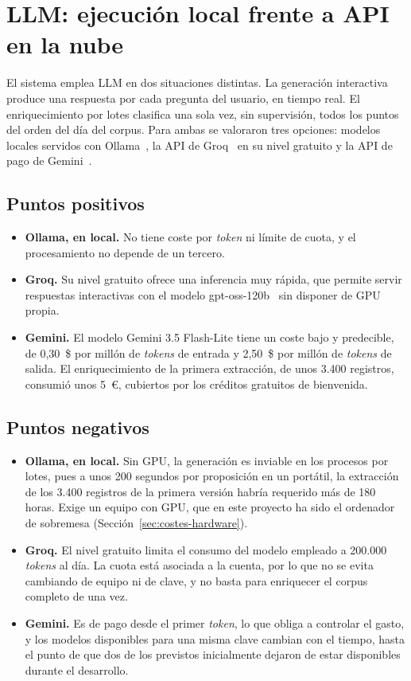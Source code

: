 \documentclass[11pt, a4paper]{report}
\begin{document}
	\section{LLM: ejecución local frente a API en la nube}

	El sistema emplea LLM en dos situaciones distintas. La
	generación interactiva produce una respuesta por cada pregunta del usuario, en
	tiempo real. El enriquecimiento por lotes clasifica una sola vez, sin
	supervisión, todos los puntos del orden del día del corpus. Para ambas se
	valoraron tres opciones: modelos locales servidos con
	Ollama~\cite{ollama}, la API de
	Groq~\cite{groq} en su nivel gratuito y la API de pago de
	Gemini~\cite{gemini-api}.

	\subsection{Puntos positivos}

	\begin{itemize}
		\item \textbf{Ollama, en local.} No tiene coste por \textit{token} ni límite de
		cuota, y el procesamiento no depende de un tercero.
		\item \textbf{Groq.} Su nivel gratuito ofrece una inferencia muy rápida,
		que permite servir respuestas interactivas con el modelo gpt-oss-120b~\cite{gpt-oss} sin
		disponer de GPU propia.
		\item \textbf{Gemini.} El modelo Gemini 3.5 Flash-Lite tiene un coste bajo
		y predecible, de 0,30~\$ por millón de \textit{tokens} de entrada y 2,50~\$ por
		millón de \textit{tokens} de salida. El enriquecimiento de la primera extracción,
		de unos 3.400 registros, consumió unos 5~€, cubiertos por los créditos
		gratuitos de bienvenida.
	\end{itemize}

	\subsection{Puntos negativos}

	\begin{itemize}
		\item \textbf{Ollama, en local.} Sin GPU, la generación es inviable en los procesos por lotes, pues a unos 200 segundos por proposición en un portátil,
		la extracción de los 3.400 registros de la primera versión habría requerido más de 180 horas. Exige
		un equipo con GPU, que en este proyecto ha sido el ordenador de sobremesa
		(Sección~\ref{sec:costes-hardware}).
		\item \textbf{Groq.} El nivel gratuito limita el consumo del modelo
		empleado a 200.000 \textit{tokens} al día. La cuota está asociada a la cuenta, por lo que no se evita cambiando de equipo ni de clave, y no basta para enriquecer el corpus completo de una vez.
		\item \textbf{Gemini.} Es de pago desde el primer \textit{token}, lo que obliga a
		controlar el gasto, y los modelos disponibles para una misma clave cambian con el tiempo, hasta el punto de que dos de los previstos inicialmente dejaron de estar
		disponibles durante el desarrollo.
	\end{itemize}
\end{document}
